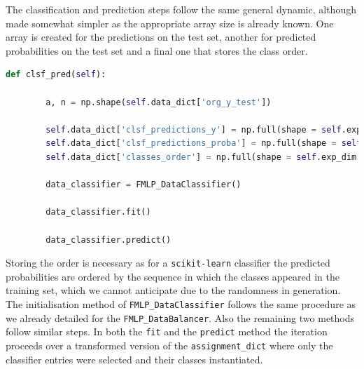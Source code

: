 The classification and prediction steps follow the same general dynamic, although made somewhat simpler as the appropriate array size is already known.
One array is created for the predictions on the test set, another for predicted probabilities on the test set and a final one that stores the class order.
 
\begin{lstlisting}[language=Python, numbers=none]
    def clsf_pred(self):

        a, n = np.shape(self.data_dict['org_y_test'])

        self.data_dict['clsf_predictions_y'] = np.full(shape = self.exp_dim + (n,), fill_value = np.nan)
        self.data_dict['clsf_predictions_proba'] = np.full(shape = self.exp_dim + (n, 2), fill_value = np.nan)
        self.data_dict['classes_order'] = np.full(shape = self.exp_dim + (2,), fill_value = np.nan)

        data_classifier = FMLP_DataClassifier()

        data_classifier.fit()

        data_classifier.predict()

\end{lstlisting}

Storing the order is necessary as for a \texttt{scikit-learn} classifier the predicted probabilities are ordered by the sequence in which the classes appeared in the training set,
which we cannot anticipate due to the randomness in generation. 
The initialisation method of \texttt{FMLP\_DataClassifier} follows the same procedure as we already detailed for the \texttt{FMLP\_DataBalancer}.
Also the remaining two methods follow similar steps. 
In both the \texttt{fit} and the \texttt{predict} method the iteration proceeds over a transformed version of the \texttt{assignment\_dict} 
where only the classifier entries were selected and their classes instantiated.

